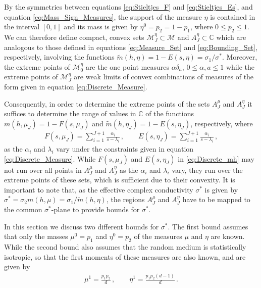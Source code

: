 \documentclass{cmslatex}
\begin{document}
By the symmetries between equations \eqref{eq:Stieltjes_F} and
\eqref{eq:Stieltjes_Es}, and equation \eqref{eq:Mass_Sign_Measures},
the support of the measure $\eta$ is contained in the interval $[0,1]$
and its mass is given by $\eta^0=p_2=1-p_1$, where $0\leq p_2\leq1$. We can
therefore define compact, convex sets $\mathscr{M}_J^\eta\subset\mathscr{M}$
and $A_J^\eta\subset\mathbb{C}$ which are analogous to those defined in
equations \eqref{eq:Measure_Set} and \eqref{eq:Bounding_Set},
respectively, involving the functions
$\tilde{m}(h,\eta)=1-E(s,\eta)=\sigma_1/\sigma^*$. Moreover, the extreme points of
$\mathscr{M}_0^\eta$ are the one point measures $\alpha\delta_a$, $0\leq\alpha,a\leq1$ 
while the extreme points of $\mathscr{M}_J^\eta$ are weak limits
of convex combinations of measures of the form given in equation
\eqref{eq:Discrete_Measure}. 



Consequently, in order to determine the extreme
points of the sets $A_J^\mu$ and $A_J^\eta$ it suffices to determine the
range of values in $\mathbb{C}$ of the functions $m(h,\mu_J)=1-F(s,\mu_J)$
and $\tilde{m}(h,\eta_J)=1-E(s,\eta_J)$, respectively, where  
%
\begin{align}\label{eq:Discrete_mh}
  F(s,\mu_J)=\sum_{i=1}^{J+1}\frac{\alpha_i}{s-\lambda_i}\,, \qquad
  E(s,\eta_J)=\sum_{i=1}^{J+1}\frac{\alpha_i}{s-\lambda_i}\,,
\end{align}
as the $\alpha_i$ and $\lambda_i$ vary under the constraints given in equation
\eqref{eq:Discrete_Measure}. While $F(s,\mu_J)$ and $E(s,\eta_J)$ in
\eqref{eq:Discrete_mh} may not run over all points in $A_J^\mu$ and
$A_J^\eta$ as the $\alpha_i$ and $\lambda_i$ vary, they run over the
extreme points of these sets, which is sufficient due to their
convexity. It is important to note that, as the effective complex
conductivity $\sigma^*$ is given by $\sigma^*=\sigma_2m(h,\mu)=\sigma_1/\tilde{m}(h,\eta)$, the
regions $A_J^\mu$ and $A_J^\eta$ have to be mapped to the common
$\sigma^*$-plane to provide bounds for $\sigma^*$.    





In this section we discuss two different bounds for $\sigma^*$. The first
bound assumes that only the masses $\mu^0=p_1$ and $\eta^0=p_2$ of the
measures $\mu$ and $\eta$ are known. While the second bound also assumes
that the random medium is statistically isotropic, so that the first
moments of these measures are also known, and are given by
\cite{Golden:1986:BCP}   
%
\begin{align}\label{eq:First_Moments}
  \mu^1=\frac{p_1p_2}{d}\,, \qquad
  \eta^1=\frac{p_1p_2(d-1)}{d}\,.
\end{align}
%
\end{document}
